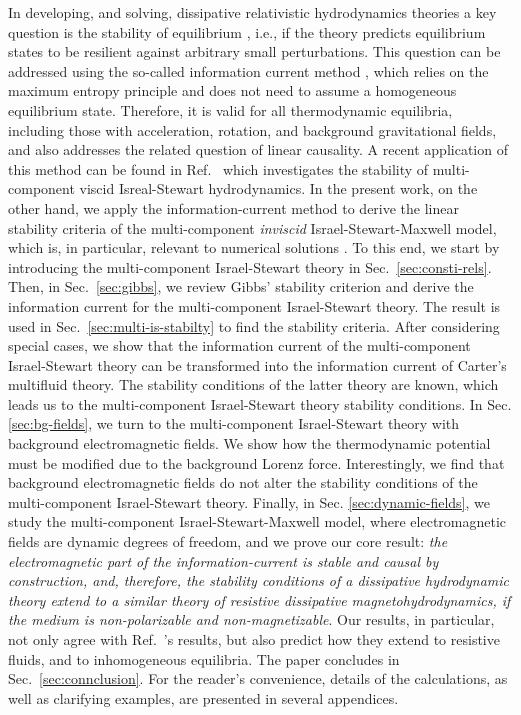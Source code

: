 \documentclass[
a4paper,
amsfonts,
amsmath,
reprint,
showkeys,
nofootinbib,
twoside,
onecolumn,
notitlepage
]{revtex4-1}
\begin{document}
	In developing, and solving, dissipative relativistic hydrodynamics theories a key question is the stability of equilibrium \cite{Hiscock_Insatibility_first_order,Hishcock1983,Kovtun2019}, i.e., if the theory predicts equilibrium states to be resilient against arbitrary small perturbations.
	This question can be addressed using the so-called information current method \cite{Hishcock1983,OlsonLifsh1990,GavassinoGibbs2021}, which relies on the maximum entropy principle and does not need to assume a homogeneous equilibrium state.
	Therefore, it is valid for all thermodynamic equilibria, including those with acceleration, rotation, and background gravitational fields, and also addresses the related question of linear causality.
	A recent application of this method can be found in Ref.\ \cite{Almaalol:2022pjc} which investigates the stability of multi-component viscid Isreal-Stewart hydrodynamics. 
	In the present work, on the other hand, we apply the information-current method to derive the linear stability criteria of the multi-component \textit{inviscid} Israel-Stewart-Maxwell model, which is, in particular, relevant to numerical solutions \cite{Dash:2022xkz}.
	To this end, we start by introducing the multi-component Israel-Stewart theory in Sec.\ \ref{sec:consti-rels}.
	Then, in Sec.\ \ref{sec:gibbs}, we review Gibbs' stability criterion and derive the information current for the multi-component Israel-Stewart theory.
	The result is used in Sec.\ \ref{sec:multi-is-stabilty} to find the stability criteria.
	After considering special cases, we show that the information current of the multi-component Israel-Stewart theory can be transformed into the information current of Carter's multifluid theory.
	The stability conditions of the latter theory are known, which leads us to the multi-component Israel-Stewart theory stability conditions.
	In Sec. \ref{sec:bg-fields}, we turn to the multi-component Israel-Stewart theory with background electromagnetic fields. We show how the thermodynamic potential must be modified due to the background Lorenz force.
	Interestingly, we find that background electromagnetic fields do not alter the stability conditions of the multi-component Israel-Stewart theory.
	Finally, in Sec. \ref{sec:dynamic-fields}, we study the multi-component Israel-Stewart-Maxwell model, where electromagnetic fields are dynamic degrees of freedom, and we prove our core result: \textit{the electromagnetic part of the information-current is stable and causal by construction, and, therefore, the stability conditions of a dissipative hydrodynamic theory extend to a similar theory of resistive dissipative magnetohydrodynamics, if the medium is non-polarizable and non-magnetizable}.
    Our results, in particular, not only agree with Ref.\ \cite{Biswas:2022gwa}'s results, but also predict how they extend to resistive fluids, and to inhomogeneous equilibria.
	The paper concludes in Sec.\ \ref{sec:connclusion}.
	For the reader's convenience, details of the calculations, as well as clarifying examples, are presented in several appendices.
	
\end{document}
